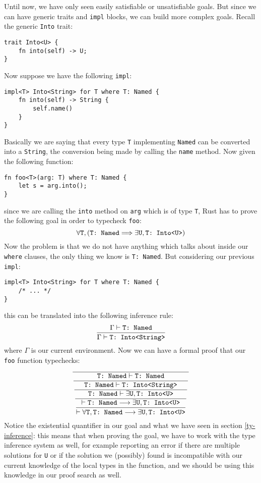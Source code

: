 \documentclass[twocolumn]{article}
\newcommand{\rust}[1]{\texttt{#1}}
\newcommand{\mrust}[1]{\text{\rust{#1}}}
\begin{document}
Until now, we have only seen easily satisfiable or unsatisfiable goals. But since we can have generic traits and \rust{impl} blocks, we can build more complex goals. Recall the generic \rust{Into} trait:
\begin{verbatim}
trait Into<U> {
    fn into(self) -> U;
}
\end{verbatim}
Now suppose we have the following \rust{impl}:
\begin{verbatim}
impl<T> Into<String> for T where T: Named {
    fn into(self) -> String {
        self.name()
    }
}
\end{verbatim}
Basically we are saying that every type \rust{T} implementing \rust{Named} can be converted into a \rust{String}, the conversion being made by calling the \rust{name} method. Now given the following function:
\begin{verbatim}
fn foo<T>(arg: T) where T: Named {
    let s = arg.into();
}
\end{verbatim}
since we are calling the \rust{into} method on \rust{arg} which is of type \rust{T}, Rust has to prove the following goal in order to typecheck \rust{foo}:
\[
    \forall \mrust{T}, (\mrust{T: Named} \Longrightarrow \exists \mrust{U}, \mrust{T: Into<U>})
\]
Now the problem is that we do not have anything which talks about \mrust{T: Into<U>} inside our \rust{where} clauses, the only thing we know is \rust{T: Named}. But considering our previous \rust{impl}:
\begin{verbatim}
impl<T> Into<String> for T where T: Named {
    /* ... */
}
\end{verbatim}
this can be translated into the following inference rule:
\[
\frac{
        \Gamma \vdash \mrust{T: Named}
    }{
      \Gamma \vdash \mrust{T: Into<String>}
    }
\]
where $\Gamma$ is our current environment. Now we can have a formal proof that our \rust{foo} function typechecks:
\[
\frac {}{
\displaystyle \frac {\mrust{T: Named} \vdash \mrust{T: Named} }
{
\displaystyle \frac { \mrust{T: Named} \vdash \mrust{T: Into<String>} }
{
\displaystyle \frac { \mrust{T: Named} \vdash \exists \mrust{U}, \mrust{T: Into<U>} } {
\displaystyle \frac { \vdash \mrust{T: Named} \longrightarrow \exists \mrust{U}, \mrust{T: Into<U>} }
{ \vdash \forall \mrust{T}, \mrust{T: Named} \longrightarrow \exists \mrust{U}, \mrust{T: Into<U>} }
}
}
}
}
\]
Notice the existential quantifier in our goal and what we have seen in section \ref{ty-inference}: this means that when proving the goal, we have to work with the type inference system as well, for example reporting an error if there are multiple solutions for \rust{U} or if the solution we (possibly) found is incompatible with our current knowledge of the local types in the function, and we should be using this knowledge in our proof search as well.
\end{document}

